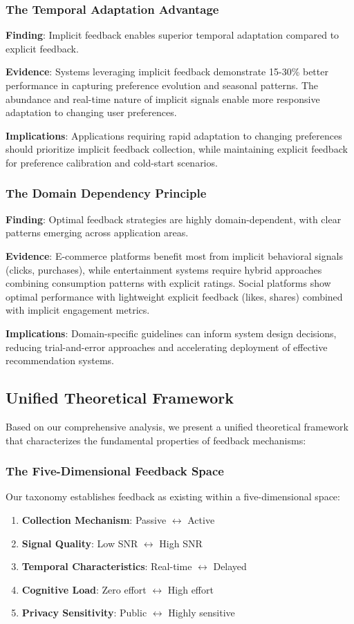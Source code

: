 \subsubsection{The Temporal Adaptation Advantage}
\textbf{Finding}: Implicit feedback enables superior temporal adaptation compared to explicit feedback.

\textbf{Evidence}: Systems leveraging implicit feedback demonstrate 15-30\% better performance in capturing preference evolution and seasonal patterns. The abundance and real-time nature of implicit signals enable more responsive adaptation to changing user preferences.

\textbf{Implications}: Applications requiring rapid adaptation to changing preferences should prioritize implicit feedback collection, while maintaining explicit feedback for preference calibration and cold-start scenarios.

\subsubsection{The Domain Dependency Principle}
\textbf{Finding}: Optimal feedback strategies are highly domain-dependent, with clear patterns emerging across application areas.

\textbf{Evidence}: E-commerce platforms benefit most from implicit behavioral signals (clicks, purchases), while entertainment systems require hybrid approaches combining consumption patterns with explicit ratings. Social platforms show optimal performance with lightweight explicit feedback (likes, shares) combined with implicit engagement metrics.

\textbf{Implications}: Domain-specific guidelines can inform system design decisions, reducing trial-and-error approaches and accelerating deployment of effective recommendation systems.

\subsection{Unified Theoretical Framework}

Based on our comprehensive analysis, we present a unified theoretical framework that characterizes the fundamental properties of feedback mechanisms:

\subsubsection{The Five-Dimensional Feedback Space}
Our taxonomy establishes feedback as existing within a five-dimensional space:
\begin{enumerate}
    \item \textbf{Collection Mechanism}: Passive $\leftrightarrow$ Active
    \item \textbf{Signal Quality}: Low SNR $\leftrightarrow$ High SNR  
    \item \textbf{Temporal Characteristics}: Real-time $\leftrightarrow$ Delayed
    \item \textbf{Cognitive Load}: Zero effort $\leftrightarrow$ High effort
    \item \textbf{Privacy Sensitivity}: Public $\leftrightarrow$ Highly sensitive
\end{enumerate}

